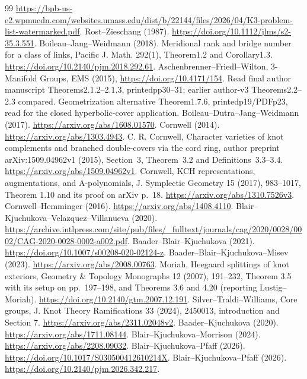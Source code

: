 \documentclass[11pt]{article}
\begin{document}
{\begin{thebibliography}{99}
\url{https://bpb-us-e2.wpmucdn.com/websites.umass.edu/dist/b/22144/files/2026/04/K3-problem-list-watermarked.pdf}.
 Rost--Zieschang (1987).
\url{https://doi.org/10.1112/jlms/s2-35.3.551}.
 Boileau--Jang--Weidmann (2018).
Meridional rank and bridge number for a class of links,
Pacific J. Math. 292(1), Theorem1.2 and Corollary1.3.
\url{https://doi.org/10.2140/pjm.2018.292.61}.
 Aschenbrenner--Friedl--Wilton, 3-Manifold Groups,
EMS (2015), \url{https://doi.org/10.4171/154}.
Read final author manuscript Theorems2.1.2--2.1.3,
printedpp30--31; earlier author-v3 Theorems2.2--2.3 compared.
Geometrization alternative Theorem1.7.6, printedp19/PDFp23,
read for the closed hyperbolic-cover application.
 Boileau--Dutra--Jang--Weidmann (2017).
\url{https://arxiv.org/abs/1608.01570}.
 Cornwell (2014).
\url{https://arxiv.org/abs/1303.4943}.
 C. R. Cornwell, Character varieties of knot
complements and branched double-covers via the cord ring,
author preprint arXiv:1509.04962v1 (2015), Section~3,
Theorem~3.2 and Definitions~3.3--3.4.
\url{https://arxiv.org/abs/1509.04962v1}.
 Cornwell, KCH representations, augmentations,
and A-polynomials, J. Symplectic Geometry 15 (2017), 983--1017,
Theorem 1.10 and its proof on arXiv p.~18.
\url{https://arxiv.org/abs/1310.7526v3}.
 Cornwell--Hemminger (2016).
\url{https://arxiv.org/abs/1408.4110}.
 Blair--Kjuchukova--Velazquez--Villanueva (2020).
\url{https://archive.intlpress.com/site/pub/files/_fulltext/journals/cag/2020/0028/0002/CAG-2020-0028-0002-a002.pdf}.
 Baader--Blair--Kjuchukova (2021).
\url{https://doi.org/10.1007/s00208-020-02124-z}.
 Baader--Blair--Kjuchukova--Misev (2023).
\url{https://arxiv.org/abs/2008.00763}.
 Moriah, Heegaard splittings of knot exteriors,
Geometry \& Topology Monographs 12 (2007), 191--232,
Theorem 3.5 with its setup on pp.~197--198, and Theorems 3.6 and 4.20
(reporting Lustig--Moriah).
\url{https://doi.org/10.2140/gtm.2007.12.191}.
 Silver--Traldi--Williams, Core groups,
J. Knot Theory Ramifications 33 (2024), 2450013, introduction and
Section 7. \url{https://arxiv.org/abs/2311.02048v2}.
 Baader--Kjuchukova (2020).
\url{https://arxiv.org/abs/1711.08144}.
 Blair--Kjuchukova--Morrison (2024).
\url{https://arxiv.org/abs/2208.09032}.
 Blair--Kjuchukova--Pfaff (2026).
\url{https://doi.org/10.1017/S030500412610214X}.
 Blair--Kjuchukova--Pfaff (2026).
\url{https://doi.org/10.2140/pjm.2026.342.217}.

\end{thebibliography}}
\end{document}
